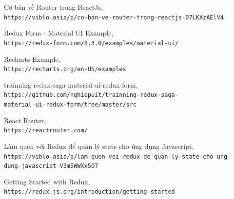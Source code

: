 \documentclass[a4paper,12pt,fleqn,print,oneside]{extarticle}
\begin{document}
\begin{thebibliography}{80}
 Cơ bản về Router trong ReactJs, \\\texttt{https://viblo.asia/p/co-ban-ve-router-trong-reactjs-07LKXzAElV4}

 Redux Form - Material UI Example, \\\texttt{https://redux-form.com/8.3.0/examples/material-ui/}

 Recharts Example, \\\texttt{https://recharts.org/en-US/examples}

 trainning-redux-saga-material-ui-redux-form, \\\texttt{https://github.com/nghiepuit/trainning-redux-saga-}
\\\texttt{material-ui-redux-form/tree/master/src}

 React Router, \\\texttt{https://reactrouter.com/}

 Làm quen với Redux để quản lý state cho ứng dụng Javascript, \\\texttt{https://viblo.asia/p/lam-quen-voi-redux-de-quan-ly-state-cho-ung-}
\\\texttt{dung-javascript-V3m5WWXx5O7}

 Getting Started with Redux, \\\texttt{https://redux.js.org/introduction/getting-started}



\end{thebibliography}
\end{document}
